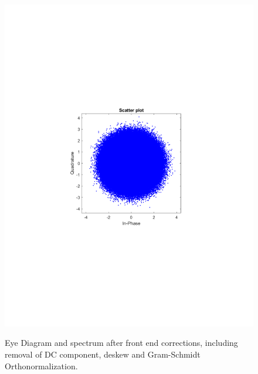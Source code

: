 \begin{refsection}
\begin{figure}[H]
\begin{minipage}{0.30\textwidth}
		\includegraphics[clip, trim=4cm 8cm 4cm 8cm, width=1\textwidth]{./sdf/m_qam_system/figures/expResults/intradyne/1_const_4GBdInSig13dB_AfFec.pdf}
		\label{fig:4GBdSpecBefFec}
	\end{minipage}
	\caption{Eye Diagram and spectrum after front end corrections, including removal of DC component, deskew and Gram-Schmidt Orthonormalization.}
\end{figure}


\end{refsection}
